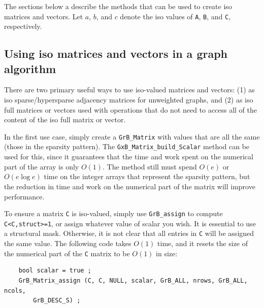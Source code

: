 The sections below a describe the methods that can be used to create iso
matrices and vectors.  Let $a$, $b$, and $c$ denote the iso values of \verb'A',
\verb'B', and \verb'C', respectively.

\subsection{Using iso matrices and vectors in a graph algorithm}
\label{iso_usage}

There are two primary useful ways to use iso-valued matrices and vectors: (1)
as iso sparse/hypersparse adjacency matrices for unweighted graphs, and (2) as
iso full matrices or vectors used with operations that do not need to access
all of the content of the iso full matrix or vector.

In the first use case, simply create a \verb'GrB_Matrix' with values that are
all the same (those in the sparsity pattern).  The
\verb'GxB_Matrix_build_Scalar' method can be used for this, since it
guarantees that the time and work spent on the numerical part of the array
is only $O(1)$.  The method still must spend $O(e)$ or $O(e \log e)$ time
on the integer arrays that represent the sparsity pattern, but the reduction
in time and work on the numerical part of the matrix will improve performance.


To ensure a matrix \verb'C' is iso-valued, simply use \verb'GrB_assign' to
compute \verb'C<C,struct>=1', or assign whatever value of scalar you wish.
It is essential to use a structural mask.  Otherwise, it is not clear that
all entries in \verb'C' will be assigned the same value.  The following
code takes $O(1)$ time, and it resets the size of the numerical part of the
\verb'C' matrix to be $O(1)$ in size:

{\footnotesize
\begin{verbatim}
    bool scalar = true ;
    GrB_Matrix_assign (C, C, NULL, scalar, GrB_ALL, nrows, GrB_ALL, ncols,
        GrB_DESC_S) ; \end{verbatim}}


